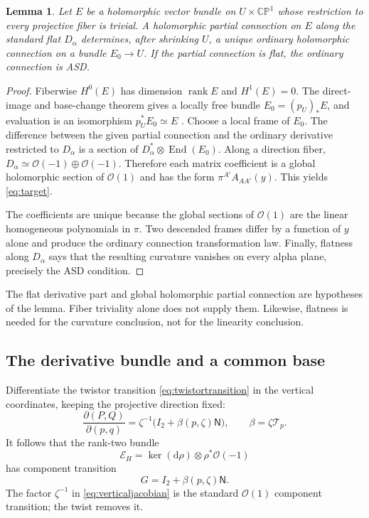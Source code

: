 \documentclass[11pt]{article}
\numberwithin{equation}{section}
\newtheorem{lemma}[theorem]{Lemma}
\theoremstyle{definition}
\theoremstyle{remark}
\newcommand{\CP}{\mathbb{CP}}
\newcommand{\OO}{\mathcal O}
\newcommand{\End}{\operatorname{End}}
\newcommand{\dd}{\mathrm d}
\newcommand{\NN}{\mathsf N}
\newcommand{\II}{I_2}
\newcommand{\calT}{\mathcal T}
\DeclareMathOperator{\rank}{rank}
\begin{document}
\begin{lemma}\label{lem:descent}
Let $E$ be a holomorphic vector bundle on $U\times\CP^1$ whose restriction to every projective fiber is trivial. A holomorphic partial connection on $E$ along the standard flat $D_\alpha$ determines, after shrinking $U$, a unique ordinary holomorphic connection on a bundle $E_0\to U$. If the partial connection is flat, the ordinary connection is ASD.
\end{lemma}
\begin{proof}
Fiberwise $H^0(E)$ has dimension $\rank E$ and $H^1(E)=0$. The direct-image and base-change theorem gives a locally free bundle $E_0=(p_U)_*E$, and evaluation is an isomorphism $p_U^*E_0\simeq E$ \cite{Grauert}. Choose a local frame of $E_0$. The difference between the given partial connection and the ordinary derivative restricted to $D_\alpha$ is a section of $D_\alpha^*\otimes\End(E_0)$. Along a direction fiber, $D_\alpha\simeq\OO(-1)\oplus\OO(-1)$. Therefore each matrix coefficient is a global holomorphic section of $\OO(1)$ and has the form $\pi^{A'}A_{AA'}(y)$. This yields \eqref{eq:target}.

The coefficients are unique because the global sections of $\OO(1)$ are the linear homogeneous polynomials in $\pi$. Two descended frames differ by a function of $y$ alone and produce the ordinary connection transformation law. Finally, flatness along $D_\alpha$ says that the resulting curvature vanishes on every alpha plane, precisely the ASD condition.
\end{proof}

The flat derivative part and global holomorphic partial connection are hypotheses of the lemma. Fiber triviality alone does not supply them. Likewise, flatness is needed for the curvature conclusion, not for the linearity conclusion.

\subsection{The derivative bundle and a common base}

Differentiate the twistor transition \eqref{eq:twistortransition} in the vertical coordinates, keeping the projective direction fixed:
\begin{equation}\label{eq:verticaljacobian}
\frac{\partial(P,Q)}{\partial(p,q)}
=\zeta^{-1}\bigl(\II+\beta(p,\zeta)\NN\bigr),
\qquad \beta=\zeta\calT_p.
\end{equation}
It follows that the rank-two bundle
\begin{equation}\label{eq:derivativebundle}
\mathcal E_H=\ker(\dd\rho)\otimes\rho^*\OO(-1)
\end{equation}
has component transition
\begin{equation}\label{eq:bundlecocycle}
G=\II+\beta(p,\zeta)\NN.
\end{equation}
The factor $\zeta^{-1}$ in \eqref{eq:verticaljacobian} is the standard $\OO(1)$ component transition; the twist removes it.
\end{document}
